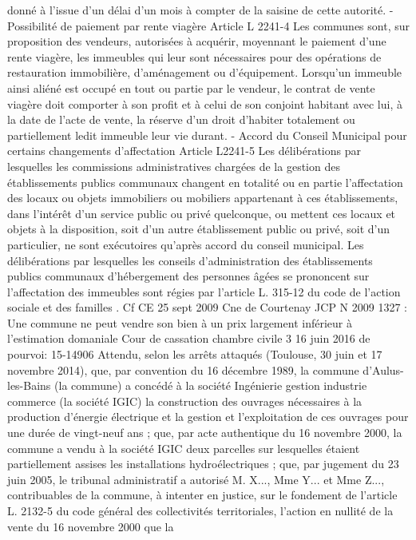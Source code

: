 \documentclass[11pt,a4paper]{report}
\begin{document}
	donné à l'issue d'un délai d'un mois à compter de la saisine de cette autorité.
	- Possibilité de paiement par rente viagère Article L 2241-4
	Les communes sont, sur proposition des vendeurs, autorisées à acquérir, moyennant le paiement d'une rente
	viagère, les immeubles qui leur sont nécessaires pour des opérations de restauration immobilière,
	d'aménagement ou d'équipement.
	Lorsqu'un immeuble ainsi aliéné est occupé en tout ou partie par le vendeur, le contrat de vente viagère doit
	comporter à son profit et à celui de son conjoint habitant avec lui, à la date de l'acte de vente, la réserve d'un
	droit d'habiter totalement ou partiellement ledit immeuble leur vie durant.
	- Accord du Conseil Municipal pour certains changements d’affectation Article L2241-5
	Les délibérations par lesquelles les commissions administratives chargées de la gestion des établissements
	publics communaux changent en totalité ou en partie l'affectation des locaux ou objets immobiliers ou mobiliers
	appartenant à ces établissements, dans l'intérêt d'un service public ou privé quelconque, ou mettent ces locaux et
	objets à la disposition, soit d'un autre établissement public ou privé, soit d'un particulier, ne sont exécutoires
	qu'après accord du conseil municipal.
	Les délibérations par lesquelles les conseils d'administration des établissements publics communaux
	d'hébergement des personnes âgées se prononcent sur l'affectation des immeubles sont régies par l'article L.
	315-12 du code de l'action sociale et des familles .
	Cf CE 25 sept 2009 Cne de Courtenay JCP N 2009 1327 : Une commune ne peut vendre son bien à un prix
	largement inférieur à l’estimation domaniale
	Cour de cassation chambre civile 3 16 juin 2016 \No  de pourvoi: 15-14906
	Attendu, selon les arrêts attaqués (Toulouse, 30 juin et 17 novembre 2014), que, par convention du 16 décembre
	1989, la commune d'Aulus-les-Bains (la commune) a concédé à la société Ingénierie gestion industrie commerce
	(la société IGIC) la construction des ouvrages nécessaires à la production d'énergie électrique et la gestion et
	l'exploitation de ces ouvrages pour une durée de vingt-neuf ans ; que, par acte authentique du 16 novembre
	2000, la commune a vendu à la société IGIC deux parcelles sur lesquelles étaient partiellement assises les
	installations hydroélectriques ; que, par jugement du 23 juin 2005, le tribunal administratif a autorisé M. X...,
	Mme Y... et Mme Z..., contribuables de la commune, à intenter en justice, sur le fondement de l'article L. 2132-5
	du code général des collectivités territoriales, l'action en nullité de la vente du 16 novembre 2000 que la
\end{document}
